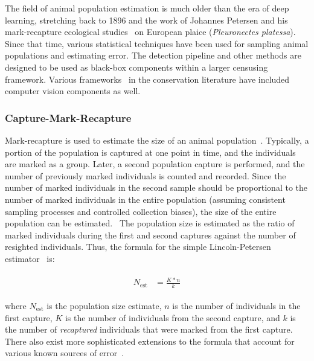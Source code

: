 The field of animal population estimation is much older than the era of deep learning, stretching back to 1896 and the work of Johannes Petersen and his mark-recapture ecological studies~\cite{petersen_yearly_1896} on European plaice (\textit{Pleuronectes platessa}).  Since that time, various statistical techniques have been used for sampling animal populations and estimating error.  The detection pipeline and other methods are designed to be used as black-box components within a larger censusing framework.  Various frameworks~\cite{parham_photographic_2015,forrester_emammalcitizen_2014,berger-wolf_ibeis:_2015} in the conservation literature have included computer vision components as well.

\subsubsection{Capture-Mark-Recapture} \label{sec:capture-mark-recapture}

Mark-recapture is used to estimate the size of an animal population~\cite{robson_sample_1964,pradel_utilization_1996,chapman_fallow_1975,karanth_estimating_2012,white_program_1999}. Typically, a portion of the population is captured at one point in time, and the individuals are marked as a group.  Later, a second population capture is performed, and the number of previously marked individuals is counted and recorded.  Since the number of marked individuals in the second sample should be proportional to the number of marked individuals in the entire population (assuming consistent sampling processes and controlled collection biases), the size of the entire population can be estimated.~\cite{berger-wolf_wildbook_2017}  The population size is estimated as the ratio of marked individuals during the first and second captures against the number of resighted individuals. Thus, the formula for the simple Lincoln-Petersen estimator~\cite{pacala_population_1985} is:

\begin{align}
    \begin{split}
        N_{\textrm{est}} &= \frac{K*n}{k}
    \end{split}
\end{align}

\noindent where $N_{\textrm{est}}$ is the population size estimate, $n$ is the number of individuals in the first capture, $K$ is the number of individuals from the second capture, and $k$ is the number of \textit{recaptured} individuals that were marked from the first capture. There also exist more sophisticated extensions to the formula that account for various known sources of error~\cite{seber_estimation_1982,chapman_fallow_1975,buckland_quantifying_1991}.

